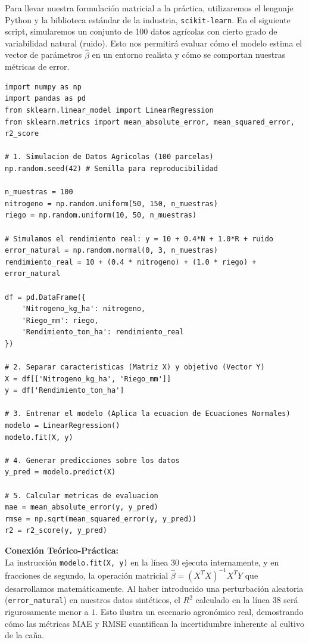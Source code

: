 \documentclass{article}
\begin{document}
Para llevar nuestra formulación matricial a la práctica, utilizaremos el lenguaje Python y la biblioteca estándar de la industria, \texttt{scikit-learn}. En el siguiente script, simularemos un conjunto de 100 datos agrícolas con cierto grado de variabilidad natural (ruido). Esto nos permitirá evaluar cómo el modelo estima el vector de parámetros $\hat{\beta}$ en un entorno realista y cómo se comportan nuestras métricas de error.


\begin{lstlisting}
import numpy as np
import pandas as pd
from sklearn.linear_model import LinearRegression
from sklearn.metrics import mean_absolute_error, mean_squared_error, r2_score

# 1. Simulacion de Datos Agricolas (100 parcelas)
np.random.seed(42) # Semilla para reproducibilidad

n_muestras = 100
nitrogeno = np.random.uniform(50, 150, n_muestras) 
riego = np.random.uniform(10, 50, n_muestras)      

# Simulamos el rendimiento real: y = 10 + 0.4*N + 1.0*R + ruido
error_natural = np.random.normal(0, 3, n_muestras) 
rendimiento_real = 10 + (0.4 * nitrogeno) + (1.0 * riego) + error_natural

df = pd.DataFrame({
    'Nitrogeno_kg_ha': nitrogeno,
    'Riego_mm': riego,
    'Rendimiento_ton_ha': rendimiento_real
})

# 2. Separar caracteristicas (Matriz X) y objetivo (Vector Y)
X = df[['Nitrogeno_kg_ha', 'Riego_mm']]
y = df['Rendimiento_ton_ha']

# 3. Entrenar el modelo (Aplica la ecuacion de Ecuaciones Normales)
modelo = LinearRegression()
modelo.fit(X, y)

# 4. Generar predicciones sobre los datos
y_pred = modelo.predict(X)

# 5. Calcular metricas de evaluacion
mae = mean_absolute_error(y, y_pred)
rmse = np.sqrt(mean_squared_error(y, y_pred))
r2 = r2_score(y, y_pred)
\end{lstlisting}

\textbf{Conexión Teórico-Práctica:} \\
La instrucción \texttt{modelo.fit(X, y)} en la línea 30 ejecuta internamente, y en fracciones de segundo, la operación matricial $\hat{\beta} = (X^T X)^{-1} X^T Y$ que desarrollamos matemáticamente. Al haber introducido una perturbación aleatoria (\texttt{error\_natural}) en nuestros datos sintéticos, el $R^2$ calculado en la línea 38 será rigurosamente menor a $1$. Esto ilustra un escenario agronómico real, demostrando cómo las métricas MAE y RMSE cuantifican la incertidumbre inherente al cultivo de la caña.
\end{document}
